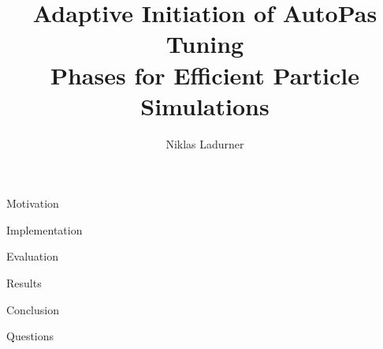 

\usepackage{booktabs}
\usepackage{amsmath}
\usepackage{mathtools}
\usepackage{pmboxdraw}
\usepackage{float}
\usepackage{listings}
\usepackage{tikz}
\usepackage{pgf}
\usepackage{pgfplots}
\usepackage{float}
\usepackage{colortbl}
\usepackage{xcolor}

\usepackage{ulem}
\usepackage{enumerate}
\usepackage{pifont}

\pgfplotsset{compat=1.16}

\usetikzlibrary{arrows,backgrounds,positioning,shapes,patterns,patterns.meta,matrix,arrows.meta,shapes.geometric,decorations.pathmorphing, matrix, fit, calc, overlay-beamer-styles, intersections}

\lstset{
	basicstyle=\ttfamily, 
	numbers=left,
	stepnumber=1,
	showstringspaces=false, 
	tabsize=4,
	breaklines=true, 
	breakatwhitespace=false,
	frame=single,
	captionpos=b, 
}



\title{Adaptive Initiation of AutoPas Tuning\\Phases for Efficient Particle Simulations}
\date{}
\author{Niklas Ladurner}



\maketitle

\begin{frame}[c]{Motivation}{}
\end{frame}

\begin{frame}[c]{Implementation}{}
\end{frame}

\begin{frame}[c]{Evaluation}{}
\end{frame}

\begin{frame}[c]{Results}{}
\end{frame}

\begin{frame}[c]{Conclusion}{}
\end{frame}


\begin{frame}[c]{}{}
	\begin{center}
		\LARGE Questions
	\end{center}
\end{frame}

\maketitle


